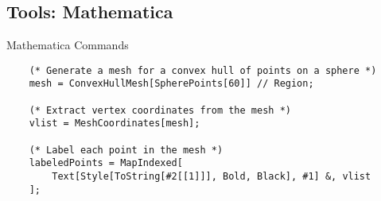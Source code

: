 \subsection{Tools: Mathematica}
\renewcommand{\listingFontSize}{\tiny} 
\begin{frame}{Mathematica Commands}
    \lstset{style=mathematica} %
    
    \begin{lstlisting}
    (* Generate a mesh for a convex hull of points on a sphere *)
    mesh = ConvexHullMesh[SpherePoints[60]] // Region;

    (* Extract vertex coordinates from the mesh *)
    vlist = MeshCoordinates[mesh];

    (* Label each point in the mesh *)
    labeledPoints = MapIndexed[
        Text[Style[ToString[#2[[1]]], Bold, Black], #1] &, vlist
    ];
    \end{lstlisting}
\end{frame}

\endinput  %
